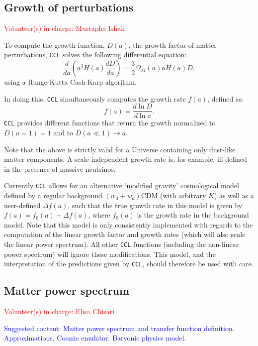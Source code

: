 \documentclass[\docopts]{\docclass}
\newcommand{\vol}[1]{\textcolor{red}{Volunteer(s) in charge: #1}}
\newcommand{\cont}[1]{\textcolor{blue}{Suggested content: #1}}
\newcommand{\ccl}{{\tt CCL}\xspace}
\begin{document}
\subsection{Growth of perturbations}
\vol{Mustapha Ishak}

To compute the growth function, $D(a)$, the growth factor of matter perturbations, \ccl solves the following differential equation:
\begin{equation}
  \frac{d}{da}\left(a^3H(a)\frac{dD}{da}\right)=\frac{3}{2}\Omega_M(a)aH(a)D,
\end{equation}
using a Runge-Kutta Cash-Karp algorithm.

In doing this, \ccl simultaneously computes the growth rate $f(a)$, defined as:
\begin{equation}
  f(a)=\frac{d\ln D}{d\ln a}.
\end{equation}
\ccl provides different functions that return the growth normalized to $D(a=1)=1$ and to $D(a\ll1)\rightarrow a$.

Note that the above is strictly valid for a Universe containing only dust-like matter components. A scale-independent growth rate is, for example, ill-defined in the presence of massive neutrinos.

Currently \ccl allows for an alternative `modified gravity' cosmological model defined by a regular background $(w_0+w_a)$CDM (with arbitrary $K$) as well as a user-defined $\Delta f(a)$, such that the true growth rate in this model is given by $f(a)=f_0(a)+\Delta f(a)$, where $f_0(a)$ is the growth rate in the background model. Note that this model is only consistently implemented with regards to the computation of the linear growth factor and growth rates (which will also scale the linear power spectrum). All other \ccl functions (including the non-linear power spectrum) will ignore these modifications. This model, and the interpretation of the predictions given by \ccl, should therefore be used with care.


\subsection{Matter power spectrum}
\vol{Elisa Chisari}

\cont{Matter power spectrum and transfer function definition. Approximations. Cosmic emulator. Baryonic physics model.}
\end{document}
